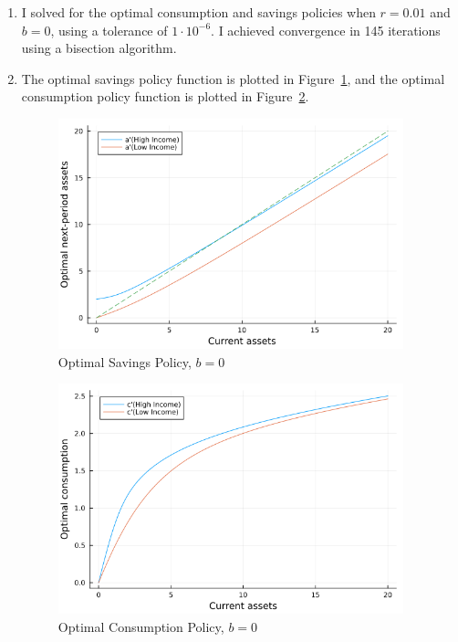 \documentclass[10pt]{article}
\begin{document}
\begin{enumerate}
	\item I solved for the optimal consumption and savings policies when $r = 0.01$ and $b = 0$, using a tolerance of $1 \cdot 10^{-6}$. I achieved convergence in 145 iterations using a bisection algorithm. \newpage
	\item The optimal savings policy function is plotted in Figure~\ref{fig1}, and the optimal consumption policy function is plotted in Figure~\ref{fig2}. \begin{figure}[H] \centering \includegraphics[width=10cm]{macro_hw4_code/savings_policy_function1.png}\caption{Optimal Savings Policy, $b = 0$}\label{fig1}\end{figure}\begin{figure}[H] \centering \includegraphics[width=10cm]{macro_hw4_code/consumption_policy_function1.png}\caption{Optimal Consumption Policy, $b=0$}\label{fig2}\end{figure} \newpage

\end{enumerate}
\end{document}
